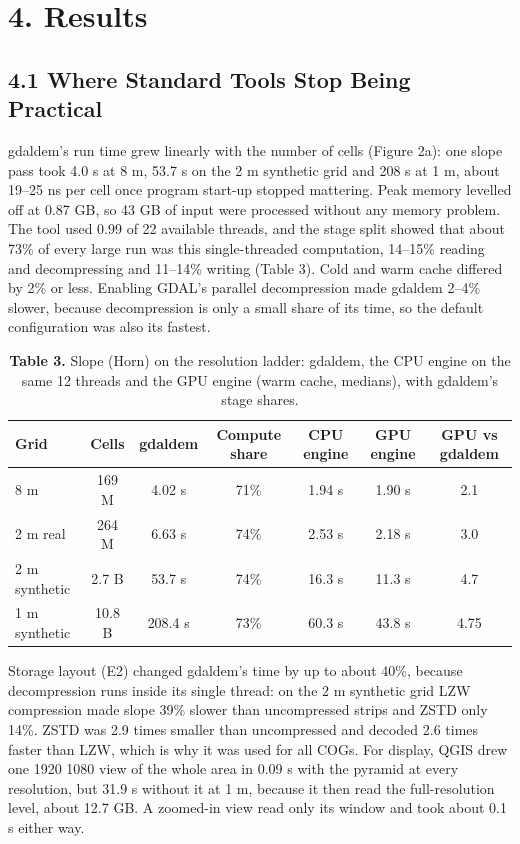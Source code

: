 \documentclass[10pt,a4paper]{article}
\begin{document}
\section*{4. Results}
\subsection*{4.1 Where Standard Tools Stop Being Practical}
gdaldem's run time grew linearly with the number of cells (Figure 2a): one slope pass took 4.0 s at 8 m, 53.7 s on the 2 m synthetic grid and 208 s at 1 m, about 19--25 ns per cell once program start-up stopped mattering. Peak memory levelled off at 0.87 GB, so 43 GB of input were processed without any memory problem. The tool used 0.99 of 22 available threads, and the stage split showed that about 73\% of every large run was this single-threaded computation, 14--15\% reading and decompressing and 11--14\% writing (Table 3). Cold and warm cache differed by 2\% or less. Enabling GDAL's parallel decompression made gdaldem 2--4\% slower, because decompression is only a small share of its time, so the default configuration was also its fastest.

\begin{table}[H]
\centering\small
\caption*{\textbf{Table 3.} Slope (Horn) on the resolution ladder: gdaldem, the CPU engine on the same 12 threads and the GPU engine (warm cache, medians), with gdaldem's stage shares.}
\begin{tabular*}{\linewidth}{@{\extracolsep{\fill}}lcccccc}
\toprule
\textbf{Grid} & \textbf{Cells} & \textbf{gdaldem} & \textbf{Compute share} & \textbf{CPU engine} & \textbf{GPU engine} & \textbf{GPU vs gdaldem} \\
\midrule
8 m & 169 M & 4.02 s & 71\% & 1.94 s & 1.90 s & 2.1\texttimes{} \\
2 m real & 264 M & 6.63 s & 74\% & 2.53 s & 2.18 s & 3.0\texttimes{} \\
2 m synthetic & 2.7 B & 53.7 s & 74\% & 16.3 s & 11.3 s & 4.7\texttimes{} \\
1 m synthetic & 10.8 B & 208.4 s & 73\% & 60.3 s & 43.8 s & 4.75\texttimes{} \\
\bottomrule
\end{tabular*}
\end{table}
Storage layout (E2) changed gdaldem's time by up to about 40\%, because decompression runs inside its single thread: on the 2 m synthetic grid LZW compression made slope 39\% slower than uncompressed strips and ZSTD only 14\%. ZSTD was 2.9 times smaller than uncompressed and decoded 2.6 times faster than LZW, which is why it was used for all COGs. For display, QGIS drew one 1920 \texttimes{} 1080 view of the whole area in 0.09 s with the pyramid at every resolution, but 31.9 s without it at 1 m, because it then read the full-resolution level, about 12.7 GB. A zoomed-in view read only its window and took about 0.1 s either way.
\end{document}
